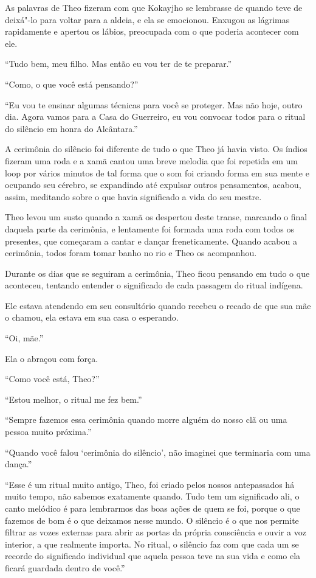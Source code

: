 As palavras de Theo fizeram com que Kokayjho se lembrasse de quando teve
de deixá"-lo para voltar para a aldeia, e ela se emocionou. Enxugou as
lágrimas rapidamente e apertou os lábios, preocupada com o que poderia
acontecer com ele.

``Tudo bem, meu filho. Mas então eu vou ter de te preparar.''

``Como, o que você está pensando?''

``Eu vou te ensinar algumas técnicas para você se proteger. Mas não
hoje, outro dia. Agora vamos para a Casa do Guerreiro, eu vou convocar
todos para o ritual do silêncio em honra do Alcântara.''

\asterisc


A cerimônia do silêncio foi diferente de tudo o que Theo já havia visto.
Os índios fizeram uma roda e a xamã cantou uma breve melodia que foi
repetida em um loop por vários minutos de tal forma que o som foi
criando forma em sua mente e ocupando seu cérebro, se expandindo até
expulsar outros pensamentos, acabou, assim, meditando sobre o que havia
significado a vida do seu mestre.

Theo levou um susto quando a xamã os despertou deste transe, marcando o
final daquela parte da cerimônia, e lentamente foi formada uma roda com
todos os presentes, que começaram a cantar e dançar freneticamente.
Quando acabou a cerimônia, todos foram tomar banho no rio e Theo os
acompanhou.

Durante os dias que se seguiram a cerimônia, Theo ficou pensando em tudo
o que aconteceu, tentando entender o significado de cada passagem do
ritual indígena.

Ele estava atendendo em seu consultório quando recebeu o recado de que
sua mãe o chamou, ela estava em sua casa o esperando.

``Oi, mãe.''

Ela o abraçou com força.

``Como você está, Theo?''

``Estou melhor, o ritual me fez bem.''

``Sempre fazemos essa cerimônia quando morre alguém do nosso clã ou uma
pessoa muito próxima.''

``Quando você falou `cerimônia do silêncio', não imaginei que terminaria
com uma dança.''

``Esse é um ritual muito antigo, Theo, foi criado pelos nossos
antepassados há muito tempo, não sabemos exatamente quando. Tudo tem um
significado ali, o canto melódico é para lembrarmos das boas ações de
quem se foi, porque o que fazemos de bom é o que deixamos nesse mundo. O
silêncio é o que nos permite filtrar as vozes externas para abrir as
portas da própria consciência e ouvir a voz interior, a que realmente
importa. No ritual, o silêncio faz com que cada um se recorde do
significado individual que aquela pessoa teve na sua vida e como ela
ficará guardada dentro de você.''

